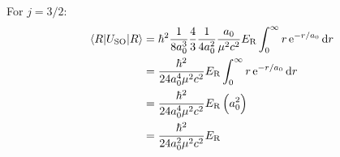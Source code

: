 For $ j = 3/2 $:
\begin{align*}
    \expectationvalue{U_{\textrm{SO}}}{R} & = \hbar^2 \frac{1}{8 a_0^3} \frac{4}{3} \frac{1}{4 a_0^2} \frac{a_0}{\mu^2 c^2} E_{\textrm{R}} \int_0^{\infty} r \operatorname{e}^{-r/a_0} \dif r\\
    & = \frac{\hbar^2}{24 a_0^4 \mu^2 c^2} E_{\textrm{R}} \int_0^{\infty} r \operatorname{e}^{-r/a_0} \dif r\\
    & = \frac{\hbar^2}{24 a_0^4 \mu^2 c^2} E_{\textrm{R}} \del{a_0^2}\\
    & = \frac{\hbar^2}{24 a_0^2 \mu^2 c^2} E_{\textrm{R}}
\end{align*}
